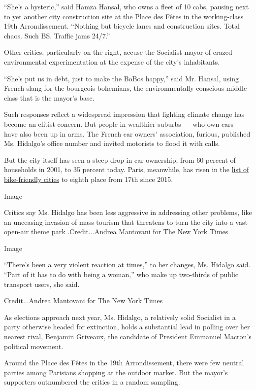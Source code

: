 ``She's a hysteric,'' said Hamza Hansal, who owns a fleet of 10 cabs,
pausing next to yet another city construction site at the Place des
Fêtes in the working-class 19th Arrondissement. ``Nothing but bicycle
lanes and construction sites. Total chaos. Such BS. Traffic jams 24/7.''

Other critics, particularly on the right, accuse the Socialist mayor of
crazed environmental experimentation at the expense of the city's
inhabitants.

``She's put us in debt, just to make the BoBos happy,'' said Mr. Hansal,
using French slang for the bourgeois bohemians, the environmentally
conscious middle class that is the mayor's base.

Such responses reflect a widespread impression that fighting climate
change has become an elitist concern. But people in wealthier suburbs
--- who own cars --- have also been up in arms. The French car owners'
association, furious, published Ms. Hidalgo's office number and invited
motorists to flood it with calls.

But the city itself has seen a steep drop in car ownership, from 60
percent of households in 2001, to 35 percent today. Paris, meanwhile,
has risen in the
\href{https://www.wired.com/story/most-bike-friendly-cities-2019-copenhagenize-design-index/}{list
of bike-friendly cities} to eighth place from 17th since 2015.

Image

Critics say Ms. Hidalgo has been less aggressive in addressing other
problems, like an unceasing invasion of mass tourism that threatens to
turn the city into a vast open-air theme park .Credit...Andrea Mantovani
for The New York Times

Image

``There's been a very violent reaction at times,'' to her changes, Ms.
Hidalgo said. ``Part of it has to do with being a woman,'' who make up
two-thirds of public transport users, she said.

Credit...Andrea Mantovani for The New York Times

As elections approach next year, Ms. Hidalgo, a relatively solid
Socialist in a party otherwise headed for extinction, holds a
substantial lead in polling over her nearest rival, Benjamin Griveaux,
the candidate of President Emmanuel Macron's political movement.

Around the Place des Fêtes in the 19th Arrondissement, there were few
neutral parties among Parisians shopping at the outdoor market. But the
mayor's supporters outnumbered the critics in a random sampling.

